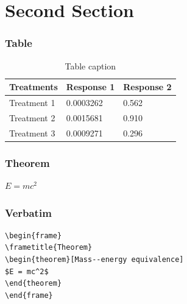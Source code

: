 \documentclass{beamer}
\begin{document}





\section{Second Section}

\begin{frame}
\frametitle{Table}
\begin{table}
\begin{tabular}{l l l}
\toprule
\textbf{Treatments} & \textbf{Response 1} & \textbf{Response 2}\\
\midrule
Treatment 1 & 0.0003262 & 0.562 \\
Treatment 2 & 0.0015681 & 0.910 \\
Treatment 3 & 0.0009271 & 0.296 \\
\bottomrule
\end{tabular}
\caption{Table caption}
\end{table}
\end{frame}


\begin{frame}
\frametitle{Theorem}
\begin{theorem}
$E = mc^2$
\end{theorem}
\end{frame}


\begin{frame}[fragile] %
\frametitle{Verbatim}
\begin{example}
\begin{verbatim}
\begin{frame}
\frametitle{Theorem}
\begin{theorem}[Mass--energy equivalence]
$E = mc^2$
\end{theorem}
\end{frame}\end{verbatim}
\end{example}
\end{frame}

\end{document}
